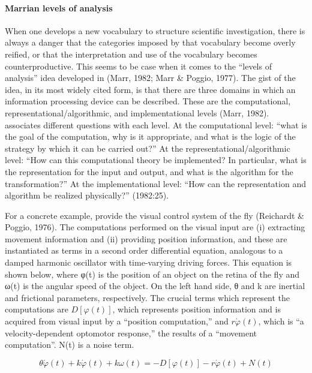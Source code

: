 \paragraph{Marrian levels of analysis}

When one develops a new vocabulary to structure scientific investigation, there is always a danger that the categories imposed by that vocabulary become overly reified, or that the interpretation and use of the vocabulary becomes counterproductive. This seems to be case when it comes to the “levels of analysis” idea developed in (Marr, 1982; Marr \& Poggio, 1977). The gist of the idea, in its most widely cited form, is that there are three domains in which an information processing device can be described. These are the computational, representational/algorithmic, and implementational levels (Marr, 1982). \citet{Marr1982} associates different questions with each level. At the computational level: “what is the goal of the computation, why is it appropriate, and what is the logic of the strategy by which it can be carried out?” At the representational/algorithmic level: “How can this computational theory be implemented? In particular, what is the representation for the input and output, and what is the algorithm for the transformation?” At the implementational level: “How  can the representation and algorithm be realized physically?” (1982:25).

  For a concrete example, \citet{MarrPoggio1977} provide the visual control system of the fly (Reichardt \& Poggio, 1976). The computations performed on the visual input are (i) extracting movement information and (ii) providing position information, and these are instantiated as terms in a second order differential equation, analogous to a damped harmonic oscillator with time-varying driving forces. This equation is shown below, where  φ(t) is the position of an object on the retina of the fly and ω(t) is the angular speed of the object. On the left hand side, θ and k are inertial and frictional parameters, respectively. The crucial terms which represent the computations are  $D\left[\varphi \left(t\right)\right]$, which represents position information and is acquired from visual input by a “position computation,” and  $r\acute{{\varphi} }\left(t\right)$, which is “a velocity-dependent optomotor response,” the results of a “movement computation”. N(t) is a noise term.

\begin{equation*}
\theta \acute{{\varphi} }\left(t\right)+k\acute{{\varphi} }\left(t\right)+\mathit{k\omega} \left(t\right)=-D\left[\varphi \left(t\right)\right]-r\acute{{\varphi} }\left(t\right)+N\left(t\right)
\end{equation*}

